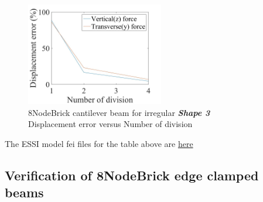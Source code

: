 \documentclass[fleqn,11pt,letter]{article}
\begin{document}

\begin{figure}[H]
    \centering
    \includegraphics[width=6cm]{../Figure_files/8NodeBrick/error8brick_beam_irregular_shape3.jpeg}
  \captionsetup{justification=centering,margin=3cm}
  \caption{8NodeBrick cantilever beam for irregular \emph{\textbf{Shape 3}}\\
      Displacement error   versus   Number of division}
  \label{fig shape 3 8NodeBrick cantilever beam for irregular more elements}
\end{figure}



The ESSI model fei files for the table above are \href{https://github.com/yuan-energy/ESSI_Verification/blob/master/8NodeBrick/cantilever_irregular_element_cut/cantilever_irregular_element_cut.tar.gz?raw=true}{here}











\newpage
\subsection{Verification of 8NodeBrick edge clamped beams }
\end{document}

